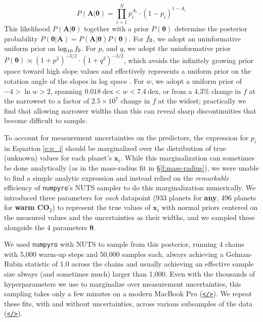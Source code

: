 \documentclass[modern,linenumbers,trackchanges]{aastex7}
\begin{document}
\begin{equation}
P(\mathbf{A} | \boldsymbol{\theta}) = \prod_{i=1}^{N} p_i^{A_i} \cdot (1-p_i)^{1-A_i}
\end{equation} 
This likelihood $P(\mathbf{A} | \boldsymbol{\theta})$
 together with a prior $P(\boldsymbol{\theta})$ determine the posterior probability $P(\boldsymbol{\theta} | \mathbf{A}) = P(\mathbf{A} | \boldsymbol{\theta}) P(\boldsymbol{\theta})$. For $f_{\sf 0}$, we adopt an uninformative uniform prior on $\log_{10} f_{\sf 0}$. For $p$, and $q$, we adopt the uninformative prior $P(\boldsymbol{\theta}) \propto (1+p^2)^{-3/2}\cdot (1+q^2)^{-3/2}$, which avoids the infinitely growing prior space toward high slope values and effectively represents a uniform prior on the rotation angle of the slopes in log space \citep[see][]{vanderplasFrequentismBayesianismPythondriven2014a}. For $w$, we adopt a uniform prior of $-4 > \ln w > 2$,  spanning $0.018~\mathrm{dex} < w < 7.4~\mathrm{dex}$, or from a 4.3\% change in $f$ at the narrowest to a factor of $2.5\times10^7$ change in $f$ at the widest; practically we find that allowing narrower widths than this can reveal sharp discontinuities that become difficult to sample. 

To account for measurement uncertainties on the predictors, the expression for $p_i$ in Equation \ref{e:p_i} should be marginalized over the distribution of true (unknown) values for each planet's $\mathbf{x}_i$. While this marginalization can sometimes be done analytically (as in the mass-radius fit in \S\ref{f:mass-radius}), we were unable to find a simple analytic expression and instead relied on the {\em remarkable} efficiency of \texttt{numpyro}'s NUTS sampler to do this marginalization numerically. We introduced three parameters for {\em each} datapoint (933 planets for {\bf any}, 496 planets for {\bf warm CO$_2$}) to represent the true values of $\mathbf{x}_i$ with normal priors centered on the measured values and the uncertainties as their widths, and we sampled these alongside the 4 parameters $\boldsymbol{\theta}$. 

We used \texttt{numpyro} with NUTS to sample from this posterior, running 4 chains with 5,000 warm-up steps and 50,000 samples each, always achieving a Gelman-Rubin statistic of 1.0 across the chains and usually achieving an effective sample size always (and sometimes much) larger than 1,000. Even with the thousands of hyperparameters we use to marginalize over measurement uncertainties, this sampling takes only a few minutes on a modern MacBook Pro (\href{https://github.com/zkbt/shoreline/blob/main/notebooks/fit-one-shoreline.ipynb}{\texttt{</>}}). We repeat these fits, with and without uncertainties, across various subsamples of the data (\href{https://github.com/zkbt/shoreline/blob/main/notebooks/fit-many-shorelines.ipynb}{\texttt{</>}}).
\end{document}
